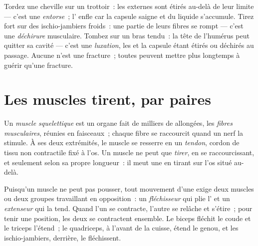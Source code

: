 \begin{example}\label{ex:g10:muscles-and-joints:injuries}
Tordez une cheville sur un trottoir~: les  externes sont
étirés au-delà de leur limite --- c'est une \emph{entorse}~;
l' enfle car la capsule saigne et du liquide s'accumule.
Tirez fort sur des ischio-jambiers froids~: une partie de leurs fibres
se rompt --- c'est une \emph{déchirure} musculaire. Tombez sur un bras
tendu~: la tête de l'humérus peut quitter sa cavité --- c'est une
\emph{luxation}, les  et la capsule étant étirés ou déchirés
au passage. Aucune n'est une fracture~; toutes peuvent mettre plus
longtemps à guérir qu'une fracture.
\end{example}

\section{Les muscles tirent, par paires}

\begin{definition}\label{def:g10:muscles-and-joints:muscle}
Un \emph{muscle squelettique} est un organe
fait de milliers de  allongées, les \emph{fibres musculaires},
réunies en faisceaux~; chaque fibre se raccourcit quand un nerf la
stimule. À ses deux extrémités, le muscle se resserre en un
\emph{tendon}, cordon de tissu non contractile fixé à
l'os. Un muscle ne peut que \emph{tirer}, en se raccourcissant, et
seulement selon sa propre longueur~: il meut une  en tirant
sur l'os situé au-delà.
\end{definition}

\begin{proposition}\label{prop:g10:muscles-and-joints:antagonists}
Puisqu'un muscle ne peut pas pousser, tout mouvement d'une 
exige deux muscles ou deux groupes travaillant en opposition~: un
\emph{fléchisseur} qui plie l' et un \emph{extenseur} qui
la tend. Quand l'un se contracte, l'autre se relâche et s'étire~; pour
tenir une position, les deux se contractent ensemble. Le biceps
fléchit le coude et le triceps l'étend~; le quadriceps, à l'avant de la
cuisse, étend le genou, et les ischio-jambiers, derrière, le
fléchissent.
\end{proposition}
\admitted

